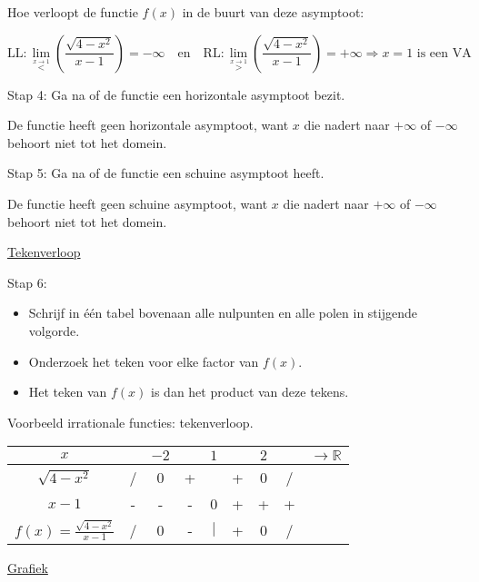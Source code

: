 \begin{voorbeeld}
Hoe verloopt de functie $f(x)$ in de buurt van deze asymptoot:

\begin{equation*}
\textrm{LL}:\lim_{\overset{x\rightarrow1}{<}}\left(\frac{\sqrt{4-x^{2}}}{x-1}\right)=-\infty\quad\textrm{en}\quad \textrm{RL}:\lim_{\overset{x\rightarrow1}{>}}\left(\frac{\sqrt{4-x^{2}}}{x-1}\right)=+\infty \Rightarrow x=1 \text{ is een VA}
\end{equation*}


Stap 4: Ga na of de functie een horizontale asymptoot bezit.

De functie heeft geen horizontale asymptoot, want $x$ die nadert
naar $+\infty$ of $-\infty$ behoort niet tot het domein.

Stap 5: Ga na of de functie een schuine asymptoot heeft.

De functie heeft geen schuine asymptoot, want $x$ die nadert naar
$+\infty$ of $-\infty$ behoort niet tot het domein.

\underline{Tekenverloop}

Stap 6:
\begin{itemize}
\item Schrijf in \'e\'en tabel bovenaan alle nulpunten en alle polen
	in stijgende volgorde. 
\item Onderzoek het teken voor elke factor van $f(x)$. 
\item Het teken van $f(x)$ is dan het product van deze tekens.
\end{itemize}


\begin{tabel}{Voorbeeld irrationale functies: tekenverloop.}
\begin{tabular}{c|cccccccc}
$x$ &  & $-2$ &  & $1$ &  & $2$ &  & $\longrightarrow\mathbb{R}$\\
\hline  
$\sqrt{4-x^{2}}$ & / & 0 & + &  & + & 0 & / & \\
$x-1$ & - & - & - & 0 & + & + & + & \\
\hline 
$f(x)=\frac{\sqrt{4-x^{2}}}{x-1}$ & / & 0 & - & $\mid$ & + & 0 & / & \\
\end{tabular}
\label{tab:irrattk}
\end{tabel}

\underline{Grafiek}


\end{voorbeeld}

